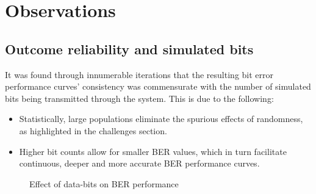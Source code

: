 \section{Observations}
\subsection{Outcome reliability and simulated bits}
It was found through innumerable iterations that the resulting bit error performance curves' consistency was commensurate with the number of simulated bits being transmitted through the system. This is due to the following:
\begin{itemize}
	\item Statistically, large populations eliminate the spurious effects of randomness, as highlighted in the challenges section.
		\item Higher bit counts allow for smaller BER values, which in turn facilitate continuous, deeper and more accurate BER performance curves.
\end{itemize}
\begin{figure}[!h]
	\centerline{}
	\caption{Effect of data-bits on BER performance}
	\label{res:fig:bervariation}
\end{figure}

